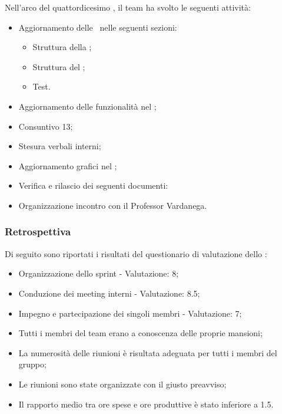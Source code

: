 Nell'arco del quattordicesimo , il team ha svolto le seguenti attività:
\begin{itemize}
  \item Aggiornamento delle \NdP\ nelle seguenti sezioni:
  \begin{itemize}
    \item Struttura della \ST;
    \item Struttura del \MU;
    \item Test.
  \end{itemize}
  \item Aggiornamento delle funzionalità nel \MU;
  \item Consuntivo  13;
  \item Stesura verbali interni;
  \item Aggiornamento grafici nel \PdQ;
  \item Verifica e rilascio dei seguenti documenti:
  \item Organizzazione incontro con il Professor Vardanega.
\end{itemize}

\subsubsection{Retrospettiva}

\par Di seguito sono riportati i risultati del questionario di valutazione dello :
\begin{itemize}
  \item Organizzazione dello sprint - Valutazione: 8;
  \item Conduzione dei meeting interni - Valutazione: 8.5;
  \item Impegno e partecipazione dei singoli membri - Valutazione: 7;
  \item Tutti i membri del team erano a conoscenza delle proprie mansioni;
  \item La numerosità delle riunioni è risultata adeguata per tutti i membri del gruppo;
  \item Le riunioni sono state organizzate con il giusto preavviso;
  \item Il rapporto medio tra ore spese e ore produttive è stato inferiore a 1.5.
\end{itemize}

